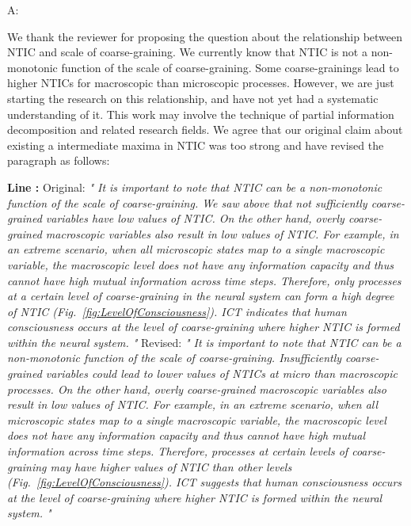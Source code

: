 \documentclass[utf8]{article}
\newenvironment{ans}  
    {\color{Black}\noindent A:}
    {~\newline}
\newcommand{\revise}[3]{
	\newline
	\newline
    \noindent
    \textbf{Line #1:}
    \newline
    Original:\newline
    \textit{"#2"}
    \newline
    \newline
    Revised:\newline
    \textit{"#3"}\newline}
\begin{document}
    	\begin{ans}
    		
    		We thank the reviewer for proposing the question about the relationship between NTIC and scale of coarse-graining. We currently know that NTIC is not a non-monotonic function of the scale of coarse-graining. Some coarse-grainings lead to higher NTICs for macroscopic than microscopic processes. However, we are just starting the research on this relationship, and have not yet had a systematic understanding of it. This work may involve the technique of partial information decomposition and related research fields. 
    		We agree that our original claim about existing a intermediate maxima in NTIC was too strong and have revised the paragraph as follows: 
			\revise{}
			{
				It is important to note that NTIC can be a non-monotonic function of the scale of coarse-graining. We saw above that not sufficiently coarse-grained variables have low values of NTIC. On the other hand, overly coarse-grained macroscopic variables  also result in low values of NTIC. For example, in an extreme scenario, when all microscopic states map to a single macroscopic variable, the macroscopic level does not have any information capacity and thus cannot have high mutual information across time steps. Therefore, only processes at a certain level of coarse-graining in the neural system can form a high degree of NTIC (Fig.~\ref{fig:LevelOfConsciousness}). ICT indicates that human consciousness occurs at the level of coarse-graining where higher NTIC is formed within the neural system.
			}
			{
				It is important to note that NTIC can be a non-monotonic function of the scale of coarse-graining. Insufficiently coarse-grained variables could lead to lower values of NTICs at micro than macroscopic processes. On the other hand, overly coarse-grained macroscopic variables also result in low values of NTIC. For example, in an extreme scenario, when all microscopic states map to a single macroscopic variable, the macroscopic level does not have any information capacity and thus cannot have high mutual information across time steps. Therefore, processes at certain levels of coarse-graining may have higher values of NTIC than other levels (Fig.~\ref{fig:LevelOfConsciousness}). ICT suggests that human consciousness occurs at the level of coarse-graining where higher NTIC is formed within the neural system.
}
\end{ans}
\end{document}
